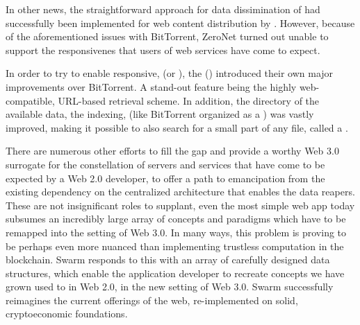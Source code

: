 In other news, the straightforward approach for data dissimination  of   had successfully been  implemented for web content distribution by  \cite{zeronet}. However, because of the aforementioned issues with BitTorrent, ZeroNet turned out unable to support the  responsivenes that users of web services have come to expect.

In order to try to enable responsive,  (or ), the  () \cite{ipfs2014}  introduced their own major improvements over BitTorrent. A stand-out feature being the highly web-compatible, URL-based retrieval scheme. In addition, the directory of the available data, the indexing, (like BitTorrent organized as a ) was vastly improved, making it possible to also search for a small part of any file, called a .

There are numerous other efforts to fill the gap and provide a worthy Web 3.0 surrogate for the constellation of servers and services that have come to be expected by a Web 2.0 developer, to offer a path to emancipation from the existing dependency on the centralized architecture that enables the data reapers. These are not insignificant roles to supplant, even the most simple web app today subsumes an incredibly large array of concepts and paradigms which have to be remapped into the  setting of Web 3.0. In many ways, this problem is proving to be perhaps even more nuanced than implementing trustless computation in the blockchain. Swarm responds to this with an array of carefully designed data structures, which enable the application developer to recreate concepts we have grown used to in Web 2.0, in the new setting of Web 3.0. Swarm successfully reimagines the current offerings of the web, re-implemented on solid, cryptoeconomic foundations.

